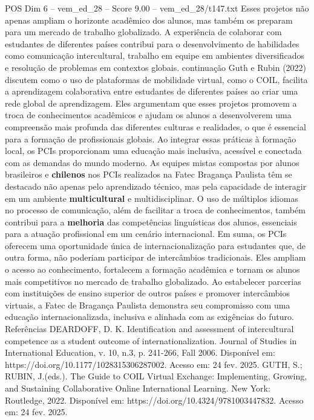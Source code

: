 \begin{textsample}{POS Dim 6 – vem\_ed\_28 – Score 9.00 – vem\_ed\_28/t147.txt}
Esses projetos não apenas ampliam o horizonte acadêmico dos alunos, mas também os preparam para um mercado de trabalho globalizado.
A experiência de colaborar com estudantes de diferentes países contribui para o desenvolvimento de habilidades como comunicação intercultural, trabalho em equipe em ambientes diversificados e resolução de problemas em contextos globais. continuação Guth e Rubin (2022) discutem como o uso de plataformas de mobilidade virtual, como o COIL, facilita a aprendizagem colaborativa entre estudantes de diferentes países ao criar uma rede global de aprendizagem.
Eles argumentam que esses projetos promovem a troca de conhecimentos acadêmicos e ajudam os alunos a desenvolverem uma compreensão mais profunda das diferentes culturas e realidades, o que é essencial para a formação de profissionais globais.
Ao integrar essas práticas à formação local, os PCIs proporcionam uma educação mais inclusiva, acessível e conectada com as demandas do mundo moderno.
As equipes mistas compostas por alunos brasileiros e \textbf{chilenos} nos PCIs realizados na Fatec Bragança Paulista têm se destacado não apenas pelo aprendizado técnico, mas pela capacidade de interagir em um ambiente \textbf{multicultural} e multidisciplinar.
O uso de múltiplos idiomas no processo de comunicação, além de facilitar a troca de conhecimentos, também contribui para a \textbf{melhoria} das competências linguísticas dos alunos, essenciais para a atuação profissional em um cenário internacional.
Em suma, os PCIs oferecem uma oportunidade única de internacionalização para estudantes que, de outra forma, não poderiam participar de intercâmbios tradicionais.
Eles ampliam o acesso ao conhecimento, fortalecem a formação acadêmica e tornam os alunos mais competitivos no mercado de trabalho globalizado.
Ao estabelecer parcerias com instituições de ensino superior de outros países e promover intercâmbios virtuais, a Fatec de Bragança Paulista demonstra seu compromisso com uma educação internacionalizada, inclusiva e alinhada com as exigências do futuro.
Referências DEARDOFF, D.
K.
Identification and assessment of intercultural competence as a student outcome of internationalization.
Journal of Studies in International Education, v. 10, n.3, p. 241-266, Fall 2006.
Disponível em: https://doi.org/10.1177/1028315306287002.
Acesso em: 24 fev. 2025.
GUTH, S.; RUBIN, J.(eds.).
The Guide to COIL Virtual Exchange: Implementing, Growing, and Sustaining Collaborative Online International Learning.
New York: Routledge, 2022.
Disponível em: https://doi.org/10.4324/9781003447832.
Acesso em: 24 fev. 2025.

\end{textsample}
